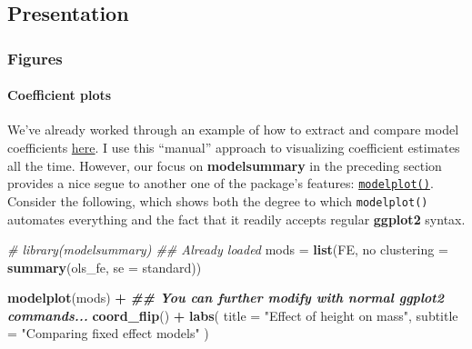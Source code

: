 \documentclass[
]{article}
\newenvironment{Shaded}{\begin{snugshade}}{\end{snugshade}}
\newcommand{\AttributeTok}[1]{\textcolor[rgb]{0.13,0.29,0.53}{#1}}
\newcommand{\CommentTok}[1]{\textcolor[rgb]{0.56,0.35,0.01}{\textit{#1}}}
\newcommand{\DocumentationTok}[1]{\textcolor[rgb]{0.56,0.35,0.01}{\textbf{\textit{#1}}}}
\newcommand{\FunctionTok}[1]{\textcolor[rgb]{0.13,0.29,0.53}{\textbf{#1}}}
\newcommand{\NormalTok}[1]{#1}
\newcommand{\OtherTok}[1]{\textcolor[rgb]{0.56,0.35,0.01}{#1}}
\newcommand{\SpecialCharTok}[1]{\textcolor[rgb]{0.81,0.36,0.00}{\textbf{#1}}}
\newcommand{\StringTok}[1]{\textcolor[rgb]{0.31,0.60,0.02}{#1}}
\begin{document}
\hypertarget{presentation}{%
\subsection{Presentation}\label{presentation}}

\hypertarget{figures}{%
\subsubsection{Figures}\label{figures}}

\hypertarget{coefficient-plots}{%
\paragraph{Coefficient plots}\label{coefficient-plots}}

We've already worked through an example of how to extract and compare
model coefficients
\protect\hyperlink{comparing-our-model-coefficients}{here}. I use this
``manual'' approach to visualizing coefficient estimates all the time.
However, our focus on \textbf{modelsummary} in the preceding section
provides a nice segue to another one of the package's features:
\href{https://vincentarelbundock.github.io/modelsummary/articles/modelplot.html}{\texttt{modelplot()}}.
Consider the following, which shows both the degree to which
\texttt{modelplot()} automates everything and the fact that it readily
accepts regular \textbf{ggplot2} syntax.

\begin{Shaded}
\begin{Highlighting}[]
\CommentTok{\# library(modelsummary) \#\# Already loaded}
\NormalTok{mods }\OtherTok{=} \FunctionTok{list}\NormalTok{(}\StringTok{\textquotesingle{}FE, no clustering\textquotesingle{}} \OtherTok{=} \FunctionTok{summary}\NormalTok{(ols\_fe, }\AttributeTok{se =} \StringTok{\textquotesingle{}standard\textquotesingle{}}\NormalTok{))}

\FunctionTok{modelplot}\NormalTok{(mods) }\SpecialCharTok{+}
  \DocumentationTok{\#\# You can further modify with normal ggplot2 commands...}
  \FunctionTok{coord\_flip}\NormalTok{() }\SpecialCharTok{+} 
  \FunctionTok{labs}\NormalTok{(}
    \AttributeTok{title =} \StringTok{"\textquotesingle{}Effect\textquotesingle{} of height on mass"}\NormalTok{,}
    \AttributeTok{subtitle =} \StringTok{"Comparing fixed effect models"}
\NormalTok{    )}
\end{Highlighting}
\end{Shaded}
\end{document}
